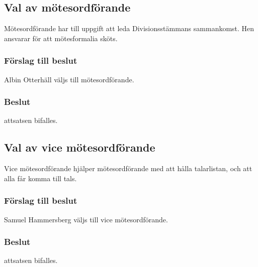 \documentclass[protokoll]{dvd}
\begin{document}
\subsection{Val av mötesordförande}

Mötesordförande har till uppgift att leda Divisionsstämmans sammankomst.
Hen ansvarar för att mötesformalia sköts.

\subsubsection*{Förslag till beslut}

\begin{attsatser}
	\item Albin Otterhäll väljs till mötesordförande.
\end{attsatser}

\subsubsection*{Beslut}

\begin{attsatser}
	\item attsatsen bifalles.
\end{attsatser}

\newpage

\subsection{Val av vice mötesordförande}

Vice mötesordförande hjälper mötesordförande med att hålla talarlistan, och att alla får komma till tals.

\subsubsection*{Förslag till beslut}

\begin{attsatser}
	\item Samuel Hammersberg väljs till vice mötesordförande.
\end{attsatser}

\subsubsection*{Beslut}

\begin{attsatser}
	\item attsatsen bifalles.
\end{attsatser}
\end{document}
